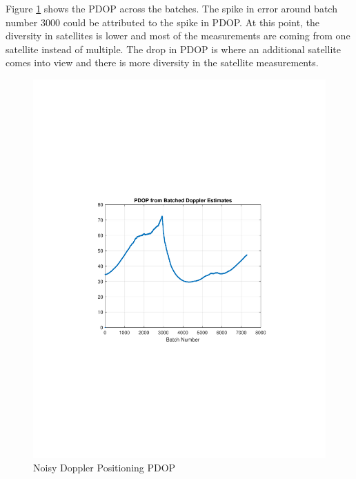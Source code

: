 \documentclass[12pt]{report}
\begin{document}
Figure \ref{fig:DirtyDoppler15minIridPDOP} shows the PDOP across the batches. The spike in error around batch number 3000 could be attributed to the spike in PDOP. At this point, the diversity in satellites is lower and most of the measurements are coming from one satellite instead of multiple. The drop in PDOP is where an additional satellite comes into view and there is more diversity in the satellite measurements. 
\begin{figure}[h!]
    \centering
    \includegraphics[trim=1.2in 3.3in 1.75in 3.3in,clip,width=5in]
    {Irid_15min_noisy_PDOPdoppler.pdf}
    \caption{Noisy Doppler Positioning PDOP}
    \label{fig:DirtyDoppler15minIridPDOP}
\end{figure}

\pagebreak
\end{document}
